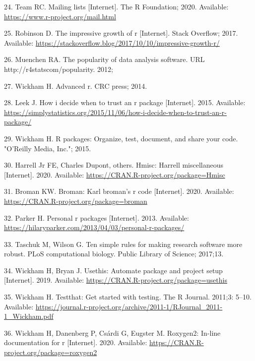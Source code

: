 \documentclass[10pt,letterpaper]{article}
\begin{document}
\leavevmode\hypertarget{ref-Rmail2020}{}%
24. Team RC. Mailing lists {[}Internet{]}. The R Foundation; 2020.
Available: \url{https://www.r-project.org/mail.html}

\leavevmode\hypertarget{ref-robinson2017}{}%
25. Robinson D. The impressive growth of r {[}Internet{]}. Stack
Overflow; 2017. Available:
\url{https://stackoverflow.blog/2017/10/10/impressive-growth-r/}

\leavevmode\hypertarget{ref-muenchen2012}{}%
26. Muenchen RA. The popularity of data analysis software. URL
http://r4statscom/popularity. 2012;

\leavevmode\hypertarget{ref-wickham2014}{}%
27. Wickham H. Advanced r. CRC press; 2014.

\leavevmode\hypertarget{ref-leek2015}{}%
28. Leek J. How i decide when to trust an r package {[}Internet{]}.
2015. Available:
\url{https://simplystatistics.org/2015/11/06/how-i-decide-when-to-trust-an-r-package/}

\leavevmode\hypertarget{ref-wickham2015}{}%
29. Wickham H. R packages: Organize, test, document, and share your
code. "O'Reilly Media, Inc."; 2015.

\leavevmode\hypertarget{ref-Hmisc}{}%
30. Harrell Jr FE, Charles Dupont, others. Hmisc: Harrell miscellaneous
{[}Internet{]}. 2020. Available:
\url{https://CRAN.R-project.org/package=Hmisc}

\leavevmode\hypertarget{ref-broman}{}%
31. Broman KW. Broman: Karl broman's r code {[}Internet{]}. 2020.
Available: \url{https://CRAN.R-project.org/package=broman}

\leavevmode\hypertarget{ref-parker2013}{}%
32. Parker H. Personal r packages {[}Internet{]}. 2013. Available:
\url{https://hilaryparker.com/2013/04/03/personal-r-packages/}

\leavevmode\hypertarget{ref-taschuk2017}{}%
33. Taschuk M, Wilson G. Ten simple rules for making research software
more robust. PLoS computational biology. Public Library of Science;
2017;13.

\leavevmode\hypertarget{ref-usethis}{}%
34. Wickham H, Bryan J. Usethis: Automate package and project setup
{[}Internet{]}. 2019. Available:
\url{https://CRAN.R-project.org/package=usethis}

\leavevmode\hypertarget{ref-testthat}{}%
35. Wickham H. Testthat: Get started with testing. The R Journal.
2011;3: 5--10. Available:
\url{https://journal.r-project.org/archive/2011-1/RJournal_2011-1_Wickham.pdf}

\leavevmode\hypertarget{ref-roxygen2}{}%
36. Wickham H, Danenberg P, Csárdi G, Eugster M. Roxygen2: In-line
documentation for r {[}Internet{]}. 2020. Available:
\url{https://CRAN.R-project.org/package=roxygen2}
\end{document}
